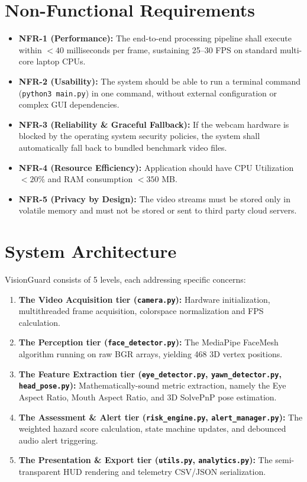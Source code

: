\documentclass[11pt,a4paper]{article}
\begin{document}
\section{Non-Functional Requirements}
\begin{itemize}
    \item \textbf{NFR-1 (Performance):} The end-to-end processing pipeline shall execute within $<40$ milliseconds per frame, sustaining 25--30 FPS on standard multi-core laptop CPUs.
    \item \textbf{NFR-2 (Usability):} The system should be able to run a terminal command (\texttt{python3 main.py}) in one command, without external configuration or complex GUI dependencies.
    \item \textbf{NFR-3 (Reliability \& Graceful Fallback):} If the webcam hardware is blocked by the operating system security policies, the system shall automatically fall back to bundled benchmark video files.
    \item \textbf{NFR-4 (Resource Efficiency):} Application should have CPU Utilization $< 20\%$ and RAM consumption $< 350$ MB.
    \item \textbf{NFR-5 (Privacy by Design):} The video streams must be stored only in volatile memory and must not be stored or sent to third party cloud servers.
\end{itemize}

\section{System Architecture}
VisionGuard consists of 5 levels, each addressing specific concerns:
\begin{enumerate}
    \item \textbf{The Video Acquisition tier (\texttt{camera.py}):} Hardware initialization, multithreaded frame acquisition, colorspace normalization and FPS calculation.
    \item \textbf{The Perception tier (\texttt{face\_detector.py}):} The MediaPipe FaceMesh algorithm running on raw BGR arrays, yielding 468 3D vertex positions.
    \item \textbf{The Feature Extraction tier (\texttt{eye\_detector.py}, \texttt{yawn\_detector.py}, \texttt{head\_pose.py}):} Mathematically-sound metric extraction, namely the Eye Aspect Ratio, Mouth Aspect Ratio, and 3D SolvePnP pose estimation.
    \item \textbf{The Assessment \& Alert tier (\texttt{risk\_engine.py}, \texttt{alert\_manager.py}):} The weighted hazard score calculation, state machine updates, and debounced audio alert triggering.
    \item \textbf{The Presentation \& Export tier (\texttt{utils.py}, \texttt{analytics.py}):} The semi-transparent HUD rendering and telemetry CSV/JSON serialization.
\end{enumerate}
\end{document}
